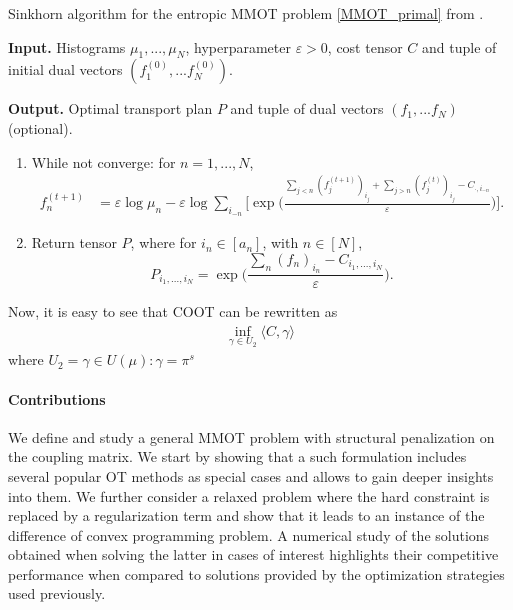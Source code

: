 \begin{algorithm}[h]
  \caption{Sinkhorn algorithm for the entropic MMOT problem \ref{MMOT_primal} from \citep{Benamou14}.}
  \textbf{Input.} Histograms $\mu_1,...,\mu_N$, hyperparameter $\varepsilon > 0$, cost tensor $C$ and
  tuple of initial dual vectors $(f^{(0)}_1, ... f^{(0)}_N)$.

  \textbf{Output.} Optimal transport plan $P$ and tuple of dual vectors $(f_1, ... f_N)$ (optional).
  \begin{enumerate}
    \item While not converge: for $n = 1, ..., N$,
    \begin{equation*}
      \begin{split}
        f^{(t+1)}_n &= \varepsilon \log \mu_n - \varepsilon \log \sum_{i_{-n}}
        \Big[ \exp\Big( \frac{\sum_{j < n} (f^{(t+1)}_j)_{i_j} + \sum_{j > n} (f^{(t)}_j)_{i_j} -
        C_{\cdot, i_{-n}}}{\varepsilon} \Big) \Big].
      \end{split}
    \end{equation*}
    \item Return tensor $P$, where for $i_n \in [a_n]$, with $n \in [N]$,
    \begin{equation*}
      P_{i_1,...,i_N} = \exp\Big( \frac{\sum_n (f_n)_{i_n} - C_{i_1,...,i_N}}{\varepsilon} \Big).
    \end{equation*}
  \end{enumerate}
  \label{algo:dual_mmot}
\end{algorithm}

Now, it is easy to see that COOT can be rewritten as
\begin{align*}
  \inf_{\gamma \in U_2} \langle C, \gamma \rangle
\end{align*}
where $U_2 = {\gamma \in U(\mu): \gamma = \pi^s }$

\paragraph{Contributions} We define and study a general MMOT problem with structural penalization on the coupling matrix.
We start by showing that a such formulation includes several popular OT methods as special cases and allows to gain deeper insights
into them. We further consider a relaxed problem where the hard constraint is replaced by a regularization term and show that it leads
to an instance of the difference of convex programming problem. A numerical study of the solutions obtained when solving the latter
in cases of interest highlights their competitive performance when compared to solutions provided by the optimization
strategies used previously.

